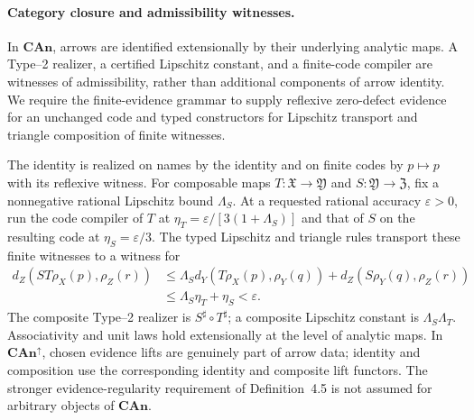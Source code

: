 
\paragraph{Category closure and admissibility witnesses.}
In $\mathbf{CAn}$, arrows are identified extensionally by their
underlying analytic maps. A Type--2 realizer, a certified Lipschitz
constant, and a finite-code compiler are witnesses of admissibility,
rather than additional components of arrow identity. We require the
finite-evidence grammar to supply reflexive zero-defect evidence for
an unchanged code and typed constructors for Lipschitz transport
and triangle composition of finite witnesses.

The identity is realized on names by the identity and on finite
codes by $p\mapsto p$ with its reflexive witness. For composable
maps $T:\mathfrak X\to\mathfrak Y$ and
$S:\mathfrak Y\to\mathfrak Z$, fix a nonnegative rational
Lipschitz bound $\Lambda_S$. At a requested rational accuracy
$\varepsilon>0$, run the code compiler of $T$ at
$\eta_T=\varepsilon/[3(1+\Lambda_S)]$ and that of $S$ on the
resulting code at $\eta_S=\varepsilon/3$. The typed Lipschitz and
triangle rules transport these finite witnesses to a witness for
\[
 \begin{aligned}
 d_Z(ST\rho_X(p),\rho_Z(r))
 &\leq\Lambda_S d_Y(T\rho_X(p),\rho_Y(q))
      +d_Z(S\rho_Y(q),\rho_Z(r))\\
 &\leq\Lambda_S\eta_T+\eta_S<\varepsilon.
 \end{aligned}
\]
The composite Type--2 realizer is $S^\sharp\circ T^\sharp$;
a composite Lipschitz constant is $\Lambda_S\Lambda_T$.
Associativity and unit laws hold extensionally at the level of
analytic maps. In $\mathbf{CAn}^{\uparrow}$, chosen evidence lifts
are genuinely part of arrow data; identity and composition use the
corresponding identity and composite lift functors. The stronger
evidence-regularity requirement of Definition~4.5 is not assumed
for arbitrary objects of $\mathbf{CAn}$.

